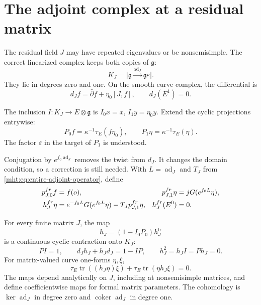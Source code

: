 \section{The adjoint complex at a residual matrix}

The residual field $J$ may have repeated eigenvalues or be nonsemisimple.
The correct linearized complex keeps both copies of $\mathfrak g$:
\begin{equation}\label{mht:eq:residual-adjoint-complex}
 K_J=\bigl[\mathfrak g\xrightarrow{\operatorname{ad}_J}
                                  \mathfrak g\varepsilon\bigr].
\end{equation}
They lie in degrees zero and one. On the smooth curve complex, the
differential is
\[
 d_Jf=\bar\partial f+\eta_0[J,f],\qquad d_J(E^1)=0.
\]

The inclusion $I:K_J\to E\otimes\mathfrak g$ is
$I_0x=x$, $I_1y=\eta_0y$. Extend the cyclic projections entrywise:
\[
 P_0f=\kappa^{-1}\tau_E(f\eta_0),\qquad
 P_1\eta=\kappa^{-1}\tau_E(\eta).
\]
The factor $\varepsilon$ in the target of $P_1$ is understood.

Conjugation by $e^{f_0\operatorname{ad}_J}$ removes the twist from
$d_J$. It changes the domain condition, so a correction is still
needed. With $L=\operatorname{ad}_J$ and $T_J$ from
\eqref{mht:eq:entire-adjoint-operator}, define
\begin{align}
 p^{\mathrm{fr}}_{J,0}f&=f(o),&
 p^{\mathrm{fr}}_{J,1}\eta&=jG(e^{f_0L}\eta),\notag\\
 h^{\mathrm{fr}}_J\eta
   &=e^{-f_0L}G(e^{f_0L}\eta)-T_Jp^{\mathrm{fr}}_{J,1}\eta,
       &h^{\mathrm{fr}}_J(E^0)&=0.
       \label{mht:eq:background-frame-h}
\end{align}

\begin{theorem}\label{mht:thm:background-contraction}
For every finite matrix $J$, the map
\begin{equation}\label{mht:eq:background-cyclic-h}
 h_J=(1-I_0P_0)h^{\mathrm{fr}}_J
\end{equation}
is a continuous cyclic contraction onto $K_J$:
\[
 PI=1,\qquad d_Jh_J+h_Jd_J=1-IP,\qquad
 h_J^2=h_JI=Ph_J=0.
\]
For matrix-valued curve one-forms $\eta,\xi$,
\begin{equation}\label{mht:eq:background-cyclic-identity}
 \tau_E\operatorname{tr}((h_J\eta)\xi)
       +\tau_E\operatorname{tr}(\eta h_J\xi)=0.
\end{equation}
The maps depend analytically on $J$, including at nonsemisimple
matrices, and define coefficientwise maps for formal matrix parameters.
The cohomology is $\ker\operatorname{ad}_J$ in degree zero and
$\operatorname{coker}\operatorname{ad}_J$ in degree one.
\end{theorem}


